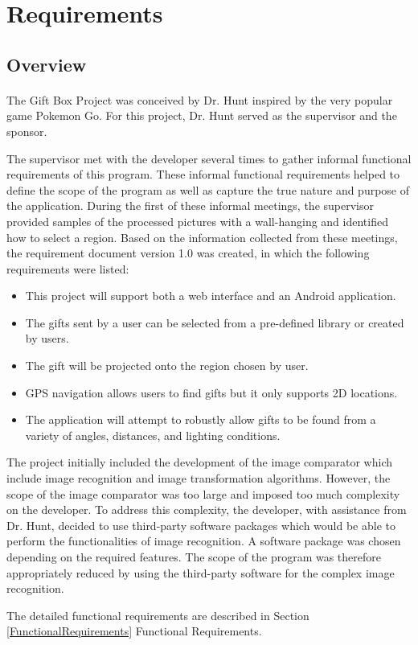 \section{Requirements}
\label{sec:Requirements}



\subsection{Overview} 
\label{RequirementsOverview}
\paragraph{}
The Gift Box Project was conceived by Dr. Hunt inspired by the very popular game Pokemon Go. For this project, Dr. Hunt served as the supervisor and the sponsor.
\par The supervisor met with the developer several times to gather informal functional requirements of this program. These informal functional requirements helped to define the scope of the program as well as capture the true nature and purpose of the application. During the first of these informal meetings, the supervisor provided samples of the processed pictures with a wall-hanging and identified how to select a region. Based on the information collected from these meetings, the requirement document version 1.0 was created, in which the following requirements were listed:
\begin{itemize}
\item This project will support both a web interface and an Android application.
\item The gifts sent by a user can be selected from a pre-defined library or created by users. 
\item The gift will be projected onto the region chosen by user.
\item GPS navigation allows users to find gifts but it only supports 2D locations. 
\item The application will attempt to robustly allow gifts to be found from a variety of angles, distances, and lighting conditions.
\end{itemize}
\par The project initially included the development of the image comparator which include image recognition and image transformation algorithms. However, the scope of the image comparator was too large and imposed too much complexity on the developer. To address this complexity, the developer, with assistance from Dr. Hunt, decided to use third-party software packages which would be able to perform the functionalities of image recognition. A software package was chosen depending on the required features. The scope of the program was therefore appropriately reduced by using the third-party software for the complex image recognition.
\par The detailed functional requirements are described in Section \ref{FunctionalRequirements} Functional Requirements. 

